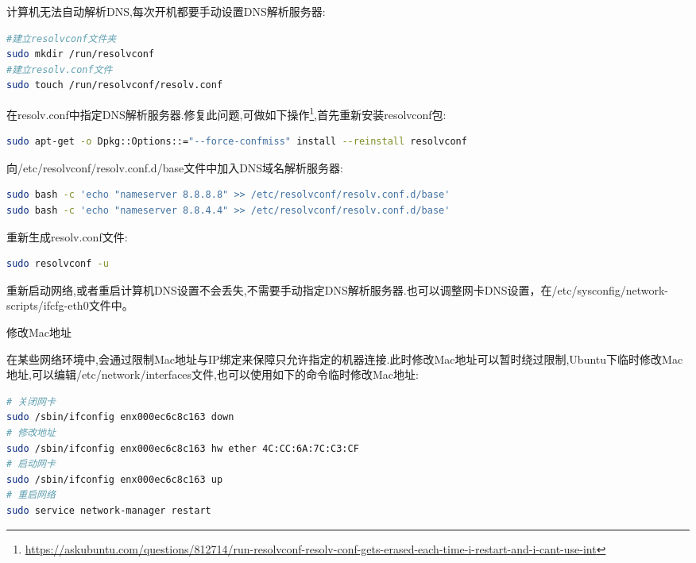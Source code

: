 \documentclass[12pt]{book}
\makeatletter
\numberwithin{dummy}{section}
\theoremstyle{ocrenumbox}
\theoremstyle{blacknumex}
\theoremstyle{blacknumbox}
\theoremstyle{ocrenum}
\renewcommand{\subsection}{\@startsection {subsection}{2}{\z@}
	{-3ex \@plus -0.1ex \@minus -.4ex}
	{0.5ex \@plus.2ex }
	{\normalfont\sffamily\bfseries}}
\makeatother
\begin{document}
计算机无法自动解析DNS,每次开机都要手动设置DNS解析服务器:

\begin{lstlisting}[language=Bash]
#建立resolvconf文件夹
sudo mkdir /run/resolvconf
#建立resolv.conf文件
sudo touch /run/resolvconf/resolv.conf
\end{lstlisting}

在resolv.conf中指定DNS解析服务器.修复此问题,可做如下操作\footnote{\url{https://askubuntu.com/questions/812714/run-resolvconf-resolv-conf-gets-erased-each-time-i-restart-and-i-cant-use-int}},首先重新安装resolvconf包:

\begin{lstlisting}[language=Bash]
sudo apt-get -o Dpkg::Options::="--force-confmiss" install --reinstall resolvconf
\end{lstlisting}

向/etc/resolvconf/resolv.conf.d/base文件中加入DNS域名解析服务器:

\begin{lstlisting}[language=Bash]
sudo bash -c 'echo "nameserver 8.8.8.8" >> /etc/resolvconf/resolv.conf.d/base'
sudo bash -c 'echo "nameserver 8.8.4.4" >> /etc/resolvconf/resolv.conf.d/base'
\end{lstlisting}

重新生成resolv.conf文件:

\begin{lstlisting}[language=Bash]
sudo resolvconf -u
\end{lstlisting}

重新启动网络,或者重启计算机DNS设置不会丢失,不需要手动指定DNS解析服务器.也可以调整网卡DNS设置，在/etc/sysconfig/network-scripts/ifcfg-eth0文件中。

\subsection{修改Mac地址}

在某些网络环境中,会通过限制Mac地址与IP绑定来保障只允许指定的机器连接.此时修改Mac地址可以暂时绕过限制,Ubuntu下临时修改Mac地址,可以编辑/etc/network/interfaces文件,也可以使用如下的命令临时修改Mac地址:

\begin{lstlisting}[language=Bash]
# 关闭网卡
sudo /sbin/ifconfig enx000ec6c8c163 down
# 修改地址
sudo /sbin/ifconfig enx000ec6c8c163 hw ether 4C:CC:6A:7C:C3:CF
# 启动网卡
sudo /sbin/ifconfig enx000ec6c8c163 up
# 重启网络
sudo service network-manager restart
\end{lstlisting}
\end{document}
